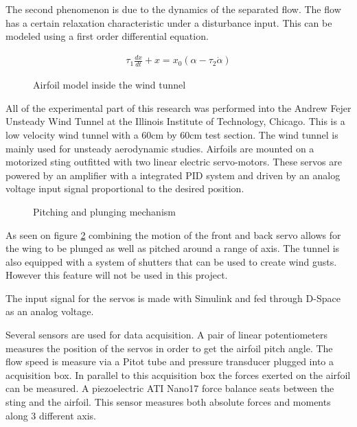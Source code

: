\par The second phenomenon is due to the dynamics of the separated flow.
The flow has a certain relaxation characteristic under a disturbance input.
This can be modeled using a first order differential equation.

\begin{eqnarray}
	\tau_1 \frac{dx}{dt} +x = x_0(\alpha - \tau_2 \dot{\alpha}) 
	\label{eqn:state_variable}
\end{eqnarray}




\begin{figure}[h]
	\begin{center}
	\end{center}
	\caption{Airfoil model inside the wind tunnel}
	\label{fig:wind_tunnel}
\end{figure}

All of the experimental part of this research was performed into the Andrew Fejer Unsteady Wind Tunnel at the Illinois Institute of Technology, Chicago.
This is a low velocity wind tunnel with a 60cm by 60cm test section.
The wind tunnel is mainly used for unsteady aerodynamic studies.
Airfoils are mounted on a motorized sting outfitted with two linear electric servo-motors.
These servos are powered by an amplifier with a integrated PID system and driven by an analog voltage input signal proportional to the desired position.

\begin{figure}[h]
	\begin{center}
	\end{center}
	\caption{Pitching and plunging mechanism}
	\label{fig:pitching_mechanism}
\end{figure}

As seen on figure \ref{fig:pitching_mechanism} combining the motion of the front and back servo allows for the wing to be plunged as well as pitched around a range of axis.
The tunnel is also equipped with a system of shutters that can be used to create wind gusts.
However this feature will not be used in this project.

\par The input signal for the servos is made with Simulink \textregistered and fed through D-Space \textregistered as an analog voltage.

\par Several sensors are used for data acquisition.
A pair of linear potentiometers measures the position of the servos in order to get the airfoil pitch angle.
The flow speed is measure via a Pitot tube and pressure transducer plugged into a acquisition box.
In parallel to this acquisition box the forces exerted on the airfoil can be measured.
A piezoelectric ATI Nano17 force balance seats between the sting and the airfoil.
This sensor measures both absolute forces and moments along 3 different axis.

